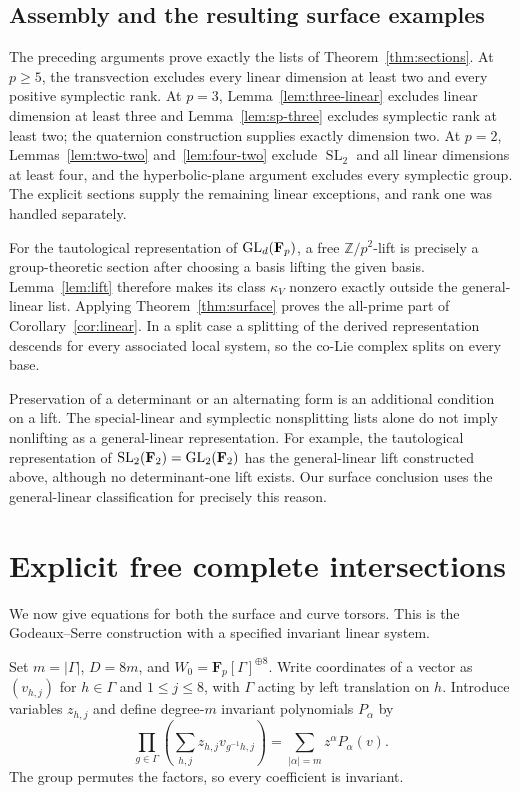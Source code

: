 \documentclass[11pt]{article}
\newcommand{\Fp}{\mathbf F_p}\newcommand{\OO}{\mathcal O}
\DeclareMathOperator{\SL}{SL}\DeclareMathOperator{\Sp}{Sp}
\theoremstyle{definition}\newtheorem{definition}[theorem]{Definition}
\theoremstyle{remark}\newtheorem{remark}[theorem]{Remark}
\begin{document}
\subsection{Assembly and the resulting surface examples}

The preceding arguments prove exactly the lists of
Theorem~\ref{thm:sections}. At $p\geq5$, the transvection excludes every
linear dimension at least two and every positive symplectic rank. At
$p=3$, Lemma~\ref{lem:three-linear} excludes linear dimension at least
three and Lemma~\ref{lem:sp-three} excludes symplectic rank at least two;
the quaternion construction supplies exactly dimension two. At $p=2$,
Lemmas~\ref{lem:two-two} and~\ref{lem:four-two} exclude $\SL_2$ and
all linear dimensions at least four, and the hyperbolic-plane argument
excludes every symplectic group. The explicit sections supply the remaining
linear exceptions, and rank one was handled separately.

For the tautological representation of $\GL_d(\Fp)$, a free
$\mathbb Z/p^2$-lift is precisely a group-theoretic section after choosing
a basis lifting the given basis. Lemma~\ref{lem:lift} therefore makes its
class $\kappa_V$ nonzero exactly outside the general-linear list. Applying
Theorem~\ref{thm:surface} proves the all-prime part of
Corollary~\ref{cor:linear}. In a split case a splitting of the derived
representation descends for every associated local system, so the
co-Lie complex splits on every base.

Preservation of a determinant or an alternating form is an additional
condition on a lift. The special-linear and symplectic nonsplitting lists
alone do not imply nonlifting as a general-linear representation. For
example, the tautological representation of
$\SL_2(\mathbf F_2)=\GL_2(\mathbf F_2)$ has the general-linear lift
constructed above, although no determinant-one lift exists. Our surface
conclusion uses the general-linear classification for precisely this reason.


\section{Explicit free complete intersections}\label{sec:equations}

We now give equations for both the surface and curve torsors. This is the Godeaux--Serre construction with a specified invariant linear system.

Set $m=|\Gamma|$, $D=8m$, and $W_0=\Fp[\Gamma]^{\oplus8}$. Write coordinates of a vector as $(v_{h,j})$ for $h\in\Gamma$ and $1\leq j\leq8$, with $\Gamma$ acting by left translation on $h$. Introduce variables $z_{h,j}$ and define degree-$m$ invariant polynomials $P_\alpha$ by
\begin{equation}\label{eq:norm}
 \prod_{g\in\Gamma}\left(\sum_{h,j}z_{h,j}v_{g^{-1}h,j}\right)
       =\sum_{|\alpha|=m}z^\alpha P_\alpha(v).
\end{equation}
The group permutes the factors, so every coefficient is invariant.
\end{document}
